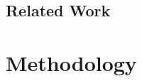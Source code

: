 \documentclass[12pt,a4paper]{report}
\begin{document}


\section{Related Work}

\chapter{Methodology}
\end{document}
